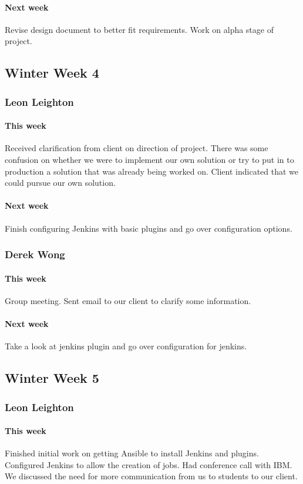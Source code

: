\documentclass[10pt,letterpaper,onecolumn,draftclsnofoot]{IEEEtran}
\begin{document}
\paragraph{Next week}Revise design document to better fit requirements.   
Work on alpha stage of project.


\subsection{Winter Week 4}
\subsubsection{Leon Leighton}
\paragraph{This week}Received clarification from client on direction of project. There was some confusion on whether we were to implement our own solution or try to put in to production a solution that was already being worked on. Client indicated that we could pursue our own solution.
\paragraph{Next week}Finish configuring Jenkins with basic plugins and go over configuration options.

\subsubsection{Derek Wong}
\paragraph{This week}Group meeting.    
Sent email to our client to clarify some information.
\paragraph{Next week}Take a look at jenkins plugin and go over configuration for jenkins.


\subsection{Winter Week 5}
\subsubsection{Leon Leighton}
\paragraph{This week}Finished initial work on getting Ansible to install Jenkins and plugins.  
Configured Jenkins to allow the creation of jobs.  
Had conference call with IBM. We discussed the need for more communication from us to students to our client.
\end{document}
